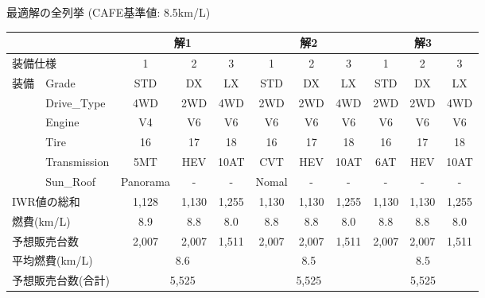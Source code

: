\documentclass[dvipdfmx, 11pt]{beamer}
\begin{document}
\begin{frame}{最適解の全列挙 {\normalsize (CAFE基準値: 8.5km/L)}}
 \begin{exampleblock}{}
  \tiny
  \centering
    \begin{tabular}{l|l|c|c|c||c|c|c||c|c|c} 
    \multicolumn{2}{l|}{} & \multicolumn{3}{c||}{解1} & \multicolumn{3}{c||}{解2} & \multicolumn{3}{c}{\bf{解3}}\\ \hline
    \multicolumn{2}{l|}{装備仕様} & 1 & 2 & 3 & 1 & 2 & 3 & 1 & 2 & 3 \\ \hline
    装備 & \textsf{Grade}        & \textsf{STD}& \textsf{DX} & \textsf{LX}& \textsf{STD} & \textsf{DX}  & \textsf{LX}    & \textsf{STD} & \textsf{DX}  & \textsf{LX}       \\
        & \textsf{Drive\_Type}  & \textsf{4WD}  & \textsf{2WD} & \textsf{4WD} & \textsf{2WD} & \textsf{2WD} & \textsf{4WD} & \textsf{2WD} & \textsf{2WD} & \textsf{4WD}  \\
        & \textsf{Engine} & \textsf{V4} & \textsf{V6} & \textsf{V6} & \textsf{V6} & \textsf{V6} & \textsf{V6} & \textsf{V6} & \textsf{V6} & \textsf{V6}      \\ 
        & \textsf{Tire} & \textsf{16}	& \textsf{17} & \textsf{18} & \textsf{16}  & \textsf{17}  & \textsf{18} & \textsf{16} & \textsf{17} & \textsf{18} \\
        & \textsf{Transmission} & \textsf{5MT} & \textsf{HEV} & \textsf{10AT} & \textsf{CVT} & \textsf{HEV} & \textsf{10AT}  & \textsf{6AT} & \textsf{HEV} & \textsf{10AT}     \\
        & \textsf{Sun\_Roof} & \textsf{Panorama} & -   & -       & \textsf{Nomal} & -  & -     & -   & -   & -       \\ \hline
    \multicolumn{2}{l|}{IWR値の総和}  & 1,128 & 1,130   & 1,255    & 1,130 & 1,130&1,255  & 1,130& 1,130& 1,255     \\ %
    \multicolumn{2}{l|}{燃費(km/L)}    & 8.9 & 8.8    & 8.0     & 8.8 & 8.8  & 8.0 & 8.8  & 8.8  & 8.0         \\ %
    \multicolumn{2}{l|}{予想販売台数}  & 2,007  & 2,007   & 1,511   & 2,007 & 2,007 & 1,511 & 2,007& 2,007& 1,511       \\ \hline
    \multicolumn{2}{l|}{平均燃費(km/L)} & \multicolumn{3}{c||}{8.6} & \multicolumn{3}{c||}{8.5} & \multicolumn{3}{c}{8.5}\\ 
    \multicolumn{2}{l|}{予想販売台数(合計)}  & \multicolumn{3}{c||}{5,525} & \multicolumn{3}{c||}{5,525}  &\multicolumn{3}{c}{5,525}\\

\end{tabular}
\end{exampleblock}
\end{frame}
\end{document}
